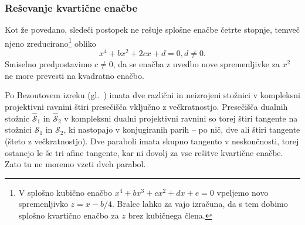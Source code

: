 \subsubsection*{Reševanje kvartične enačbe}

Kot že povedano, sledeči postopek ne rešuje splošne enačbe četrte stopnje, temveč njeno zreducirano\footnote{V splošno kubično enačbo $x^4 + bx^3 + cx^2 + dx + e = 0$ vpeljemo novo spremenljivko $z = x - b/4$. Bralec lahko za vajo izračuna, da s tem dobimo splošno kvartično enačbo za $z$ brez kubičnega člena.} obliko
\begin{equation}
    \label{eq:reduc_kvart_ev}
    x^4 + bx^2 + 2cx + d = 0, d \neq 0.
\end{equation}
Smiselno predpostavimo $c \neq 0$, da se enačba z uvedbo nove spremenljivke za $x^2$ ne more prevesti na kvadratno enačbo.

Po Bezoutovem izreku (gl.\ \cite[izrek 2.4]{terglav2022}) imata dve različni in neizrojeni stožnici v kompleksni projektivni ravnini štiri presečišča vključno z večkratnostjo. Presečišča dualnih stožnic $\mathcal{\hat{S}}_1$ in $\mathcal{\hat{S}}_2$ v kompleksni dualni projektivni ravnini so torej štiri tangente na stožnici $\mathcal{S}_1$ in $\mathcal{S}_2$, ki nastopajo v konjugiranih parih -- po nič, dve ali štiri tangente (šteto z večkratnostjo). Dve paraboli imata skupno tangento v neskončnosti, torej ostanejo le še tri afine tangente, kar ni dovolj za vse rešitve kvartične enačbe. Zato tu ne moremo vzeti dveh parabol.

